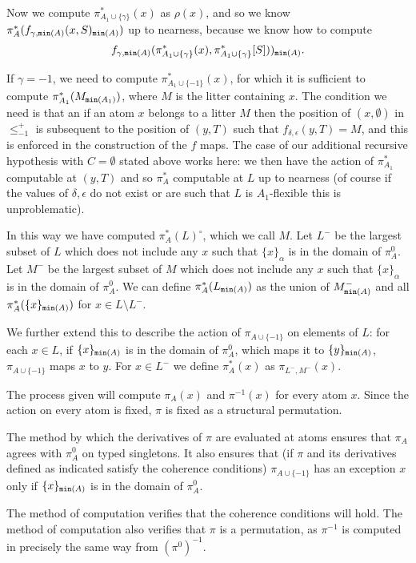 \documentclass[112pt]{article}
\begin{document}
\begin{description}
Now we compute  $\pi^*_{A_1\cup \{\gamma\}}(x)$ as $\rho(x)$, and so we know  $\pi^*_A(f_{\gamma,{\tt min}(A)}(x,S)_{{\tt min}(A)})$ up to nearness, because we know how to compute $$f_{ \gamma,{\tt min}(A)}(\pi^*_{A_1\cup \{\gamma\}}(x),\pi^*_{A_1\cup \{\gamma\}}[S]))_{{\tt min}(A)}.$$

If $\gamma=-1$, we need to compute $\pi^*_{A_1\cup \{-1\}}(x)$, for which it is sufficient to compute $\pi^*_{A_1}(M_{{\tt min}(A_1)})$, where $M$ is the litter containing $x$.  The condition we need is that an if an atom $x$ belongs to a litter $M$ then the position of $(x,\emptyset)$ in
$\leq^+_{-1}$ is subsequent to the position of $(y,T)$ such that $f_{\delta,\epsilon}(y,T)=M$, and this is enforced in the construction of the $f$ maps.  The case of our additional recursive hypothesis with $C = \emptyset$ stated above works here:  we then have the action of $\pi^*_{A_1}$ computable at $(y,T)$ and so $\pi^*_A$ computable at $L$ up to nearness (of course if the values of $\delta, \epsilon$ do not exist or are such that $L$ is $A_1$-flexible this is unproblematic).

In this way we have computed $\pi^*_A(L)^\circ$, which we call $M$.  Let $L^-$ be the largest subset of $L$ which does not include any $x$ such that $\{x\}_\alpha$ is in the domain of $\pi^0_A$.  Let $M^-$ be the largest subset of $M$ which does not include any $x$ such that $\{x\}_\alpha$ is in the domain of $\pi^0_A$.  We can define $\pi^*_A(L_{{\tt min}(A)})$ as the union of $M^-_{{\tt min}(A)}$ and all $\pi^*_A(\{x\}_{{\tt min}(A)})$ for $x \in L\setminus L^-$.

We further extend this to describe the action of $\pi_{A \cup \{-1\}}$ on elements of $L$:
for each $x \in L$, if $\{x\}_{{\tt min}(A)}$ is in the domain of $\pi^0_A$, which maps it to $\{y\}_{{\tt min}(A)}$, $\pi_{A \cup \{-1\}}$ maps $x$ to $y$.   For $x \in L^-$ we define $\pi^*_A(x)$ as $\pi_{L^-,M^-}(x)$.

 The process given will compute $\pi_A(x)$ and $\pi^{-1}(x)$ for every atom $x$.  Since the action on every atom is fixed, $\pi$ is fixed as a structural permutation.

The method by which the derivatives of $\pi$ are evaluated at atoms ensures that $\pi_A$ agrees with $\pi^0_A$ on typed singletons.  It also ensures that (if $\pi$ and its derivatives defined as indicated satisfy
the coherence conditions) $\pi_{A \cup \{-1\}}$ has an exception $x$ only if $\{x\}_{{\tt min}(A)}$ is in the domain of $\pi^0_A$.

The method of computation verifies that the coherence conditions will hold.  The method of computation also verifies that $\pi$ is a permutation, as $\pi^{-1}$ is computed in precisely the same way from $(\pi^0)^{-1}$.

\end{description}
\end{document}
